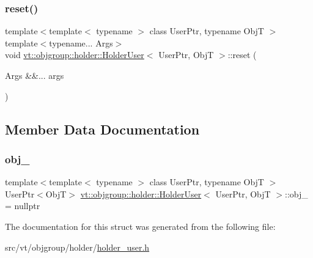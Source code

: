 \subsubsection{\texorpdfstring{reset()}{reset()}}
{\footnotesize\ttfamily template$<$template$<$ typename $>$ class User\+Ptr, typename ObjT $>$ \\
template$<$typename... Args$>$ \\
void \hyperlink{structvt_1_1objgroup_1_1holder_1_1_holder_user}{vt\+::objgroup\+::holder\+::\+Holder\+User}$<$ User\+Ptr, ObjT $>$\+::reset (\begin{DoxyParamCaption}\item[{Args \&\&...}]{args }\end{DoxyParamCaption})\hspace{0.3cm}{\ttfamily [inline]}}



\subsection{Member Data Documentation}
\mbox{\label{structvt_1_1objgroup_1_1holder_1_1_holder_user_a7e5ba27e81a9cb9aa4bfe4eb3ee04e5c}} 
\subsubsection{\texorpdfstring{obj\+\_\+}{obj\_}}
{\footnotesize\ttfamily template$<$template$<$ typename $>$ class User\+Ptr, typename ObjT $>$ \\
User\+Ptr$<$ObjT$>$ \hyperlink{structvt_1_1objgroup_1_1holder_1_1_holder_user}{vt\+::objgroup\+::holder\+::\+Holder\+User}$<$ User\+Ptr, ObjT $>$\+::obj\+\_\+ = nullptr\hspace{0.3cm}{\ttfamily [private]}}



The documentation for this struct was generated from the following file\+:\begin{DoxyCompactItemize}
\item 
src/vt/objgroup/holder/\hyperlink{holder__user_8h}{holder\+\_\+user.\+h}\end{DoxyCompactItemize}

